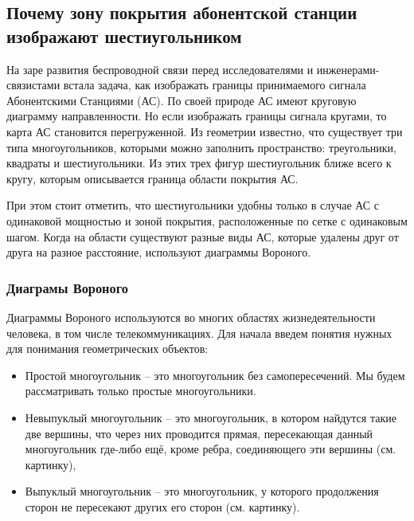 \subsection{Почему зону покрытия абонентской станции изображают шестиугольником}



На заре развития беспроводной связи перед исследователями и инженерами-связистами встала задача, как изображать границы принимаемого сигнала Абонентскими Станциями (АС). По своей природе АС имеют круговую диаграмму направленности. Но если изображать границы сигнала кругами, то карта АС становится перегруженной. Из геометрии известно, что существует три типа многоугольников, которыми можно заполнить пространство: треугольники, квадраты и шестиугольники. Из этих трех фигур шестиугольник ближе всего к кругу, которым описывается граница области покрытия АС. 

При этом стоит отметить, что шестиугольники удобны только в случае АС с одинаковой мощностью и зоной покрытия, расположенные по сетке с одинаковым шагом. Когда на области существуют разные виды АС, которые удалены друг от друга на разное расстояние, используют диаграммы Вороного. 

\subsubsection{Диаграмы Вороного}

Диаграммы Вороного используются во многих областях жизнедеятельности человека, в том числе телекоммуникациях. Для начала введем понятия нужных для понимания геометрических объектов:

\begin{itemize}
	\item Простой многоугольник -- это многоугольник без самопересечений. Мы будем рассматривать только простые многоугольники.
	\item Невыпуклый многоугольник -- это многоугольник, в котором найдутся такие две вершины, что через них проводится прямая, пересекающая данный многоугольник где-либо ещё, кроме ребра, соединяющего эти вершины (см. картинку), 
	\item Выпуклый многоугольник -- это многоугольник, у которого продолжения сторон не пересекают других его сторон (см. картинку).
\end{itemize}

